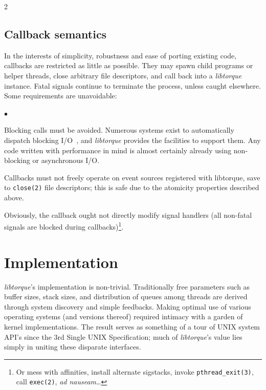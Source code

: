 \documentclass[letterpaper,10pt]{article}
\newcommand{\squishlist}{\begin{list}{$\bullet$}
  {\setlength{\itemsep}{0pt}
    \setlength{\parsep}{3pt}
    \setlength{\topsep}{3pt}
    \setlength{\partopsep}{0pt}
    \setlength{\leftmargin}{1.5em}
    \setlength{\labelwidth}{1em}
    \setlength{\labelsep}{0.5em}}}
\newcommand{\squishend}{\end{list}}
\begin{document}
\begin{multicols}{2}
\subsection{Callback semantics}
In the interests of simplicity, robustness and ease of porting existing code,
callbacks are restricted as little as possible. They may spawn child programs
or helper threads, close arbitrary file descriptors, and call back into a
\textit{libtorque} instance. Fatal signals continue to terminate the process,
unless caught elsewhere. Some requirements are unavoidable:
\squishlist
\item Blocking calls must be avoided. Numerous systems exist to automatically
dispatch blocking I/O~\cite{Crameri06}, and \textit{libtorque} provides
the facilities to support them. Any code written with performance in
mind is almost certainly already using non-blocking or asynchronous I/O.
\item Callbacks must not freely operate on event sources registered with libtorque,
save to \texttt{close(2)} file descriptors; this is safe due to the atomicity properties described above.
\item Obviously, the callback ought not directly modify signal handlers (all
non-fatal signals are blocked during callbacks)\footnote{Or mess with affinities,
install alternate sigstacks, invoke \texttt{pthread\_exit(3)},
call \texttt{exec(2)}, \textit{ad nauseam}\dots}.
\squishend 
\section{Implementation}
\textit{libtorque}'s implementation is non-trivial. Traditionally free
parameters such as buffer sizes, stack sizes, and distribution of queues
among threads are derived through system discovery and simple feedbacks.
Making optimal use of various operating systems (and versions thereof)
required intimacy with a garden of kernel implementations. The result serves
as something of a tour of UNIX system API's since the 3rd Single UNIX
Specification; much of \textit{libtorque}'s value lies simply in uniting
these disparate interfaces.

\end{multicols}
\end{document}
